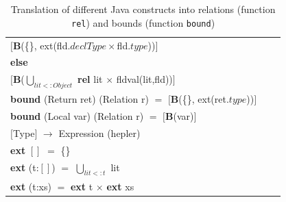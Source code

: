 \documentclass[11pt,twoside,a4paper]{book}
\begin{document}
\begin{table}[ht]
\begin{tabular}{|l|l|l|}
\hspace{10mm} $[$\textbf{B}(\{\}, ext(fld.$declType \times
$fld.$type$))$]$\\ 

\hspace{5mm} \textbf{else}\\
\hspace{10mm} $[$\textbf{B}($ 	\bigcup_{lit<:Object}$
  \textbf{rel} lit $\times$ fldval(lit,fld))$]$\\\textbf{bound}
  (Return ret) (Relation r)\hspace{5mm} $=$ \hspace{2mm} $[$\textbf{B}(\{\},
  ext(ret.$type$))$]$\\
 \textbf{bound}
  (Local var) (Relation r)\hspace{7mm} $=$ \hspace{2mm} $[$\textbf{B}(var)$]$\\
  \hline
  \hline
  \rowcolor[gray]{.8}   $[$Type$]$ $\rightarrow$
  Expression \hspace{40mm} (hepler)\\
  \hline
  \hline
  
  \textbf{ext} $[]$ \hspace{49.5mm} $=$ \hspace{2mm} \{\}\\ 
  \textbf{ext} (t:$[]$)  \hspace{44mm} $=$ \hspace{2mm} $ \bigcup_{lit<:t}$
  lit\\ \textbf{ext} (t:xs) \hspace{42.5mm} $=$ \hspace{2mm} \textbf{ext} t
  $\times$ \textbf{ext} xs\\
  \hline
  
  \end{tabular}
  \caption{Translation of different Java constructs into relations (function
  \texttt{rel}) and bounds (function \texttt{bound})}
  \label{tab:translationsToRelations}
\end{table}

\newpage
\end{document}
